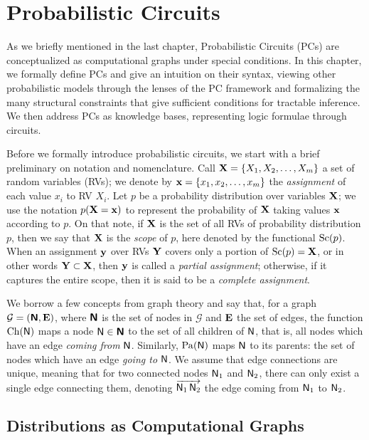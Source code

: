 \chapter{Probabilistic Circuits}
\label{ch:pc}

As we briefly mentioned in the last chapter, Probabilistic Circuits (PCs) are conceptualized as
computational graphs under special conditions. In this chapter, we formally define PCs and give an
intuition on their syntax, viewing other probabilistic models through the lenses of the PC
framework and formalizing the many structural constraints that give sufficient conditions for
tractable inference. We then address PCs as knowledge bases, representing logic formulae through
circuits.

Before we formally introduce probabilistic circuits, we start with a brief preliminary on notation
and nomenclature. Call $\mathbf{X}=\{X_1,X_2,\ldots,X_m\}$ a set of random variables (RVs); we denote
by $\mathbf{x}=\{x_1,x_2,\ldots,x_m\}$ the \emph{assignment} of each value $x_i$ to RV $X_i$. Let $p$
be a probability distribution over variables $\mathbf{X}$; we use the notation $p(\mathbf{X}=\mathbf{x})$ to
represent the probability of $\mathbf{X}$ taking values $\mathbf{x}$ according to $p$. On that note, if
$\mathbf{X}$ is the set of all RVs of probability distribution $p$, then we say that $\mathbf{X}$ is the
\emph{scope} of $p$, here denoted by the functional $\operatorname*{\normalfont{Sc}}(p)$. When an assignment $\mathbf{y}$ over RVs
$\mathbf{Y}$ covers only a portion of $\operatorname*{\normalfont{Sc}}(p)=\mathbf{X}$, or in other words $\mathbf{Y}\subset\mathbf{X}$,
then $\mathbf{y}$ is called a \emph{partial assignment}; otherwise, if it captures the entire scope,
then it is said to be a \emph{complete assignment}.

We borrow a few concepts from graph theory and say that, for a graph
$\mathcal{G}=(\operatorname{\textup{\textsf{\textbf{N}}}},\mathbf{E})$, where $\operatorname{\textup{\textsf{\textbf{N}}}}$ is the set of nodes in $\mathcal{G}$ and $\mathbf{E}$
the set of edges, the function $\operatorname*{\normalfont{Ch}}(\operatorname{\textup{\textsf{N}}})$ maps a node $\operatorname{\textup{\textsf{N}}}\in\operatorname{\textup{\textsf{\textbf{N}}}}$ to the set of all children
of $\operatorname{\textup{\textsf{N}}}$, that is, all nodes which have an edge \emph{coming from} $\operatorname{\textup{\textsf{N}}}$. Similarly,
$\operatorname*{\normalfont{Pa}}(\operatorname{\textup{\textsf{N}}})$ maps $\operatorname{\textup{\textsf{N}}}$ to its parents: the set of nodes which have an edge \emph{going to}
$\operatorname{\textup{\textsf{N}}}$. We assume that edge connections are unique, meaning that for two connected nodes $\operatorname{\textup{\textsf{N}}}_1$
and $\operatorname{\textup{\textsf{N}}}_2$, there can only exist a single edge connecting them, denoting
$\overrightarrow{\operatorname{\textup{\textsf{N}}}_1\operatorname{\textup{\textsf{N}}}_2}$ the edge coming from $\operatorname{\textup{\textsf{N}}}_1$ to $\operatorname{\textup{\textsf{N}}}_2$.

\section{Distributions as Computational Graphs}
\label{sec:pc}

